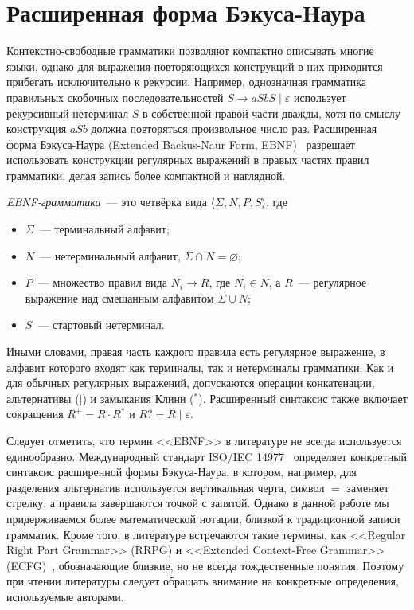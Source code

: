 \section{Расширенная форма Бэкуса-Наура}
\label{sec:EBNF}

Контекстно-свободные грамматики позволяют компактно описывать многие языки, однако для выражения повторяющихся конструкций в них приходится прибегать исключительно к рекурсии.
Например, однозначная грамматика правильных скобочных последовательностей $S \to a S b S \mid \varepsilon$ использует рекурсивный нетерминал $S$ в собственной правой части дважды, хотя по смыслу конструкция $a S b$ должна повторяться произвольное число раз.
Расширенная форма Бэкуса-Наура (Extended Backus-Naur Form, EBNF)~ разрешает использовать конструкции регулярных выражений в правых частях правил грамматики, делая запись более компактной и наглядной.

\begin{definition}
    \emph{EBNF-грамматика}~--- это четвёрка вида $\langle \Sigma, N, P, S \rangle$, где
    \begin{itemize}
        \item $\Sigma$~--- терминальный алфавит;
        \item $N$~--- нетерминальный алфавит, $\Sigma \cap N = \varnothing$;
        \item $P$~--- множество правил вида $N_i \to R$, где $N_i \in N$, а $R$~--- регулярное выражение над смешанным алфавитом $\Sigma \cup N$;
        \item $S$~--- стартовый нетерминал.
    \end{itemize}
\end{definition}

Иными словами, правая часть каждого правила есть регулярное выражение, в алфавит которого входят как терминалы, так и нетерминалы грамматики.
Как и для обычных регулярных выражений, допускаются операции конкатенации, альтернативы ($\mid$) и замыкания Клини ($^*$).
Расширенный синтаксис также включает сокращения $R^+ = R \cdot R^*$ и $R? = R \mid \varepsilon$.

Следует отметить, что термин <<EBNF>> в литературе не всегда используется единообразно.
Международный стандарт ISO/IEC 14977~ определяет конкретный синтаксис расширенной формы Бэкуса-Наура, в котором, например, для разделения альтернатив используется вертикальная черта, символ $=$ заменяет стрелку, а правила завершаются точкой с запятой.
Однако в данной работе мы придерживаемся более математической нотации, близкой к традиционной записи грамматик.
Кроме того, в литературе встречаются такие термины, как <<Regular Right Part Grammar>> (RRPG) и <<Extended Context-Free Grammar>> (ECFG)~, обозначающие близкие, но не всегда тождественные понятия.
Поэтому при чтении литературы следует обращать внимание на конкретные определения, используемые авторами.


